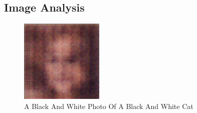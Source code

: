 \documentclass{article}%
\begin{document}
%
\subsection{Image Analysis}%
\label{subsec:ImageAnalysis}%


\begin{figure}[h!]%
\centering%
\includegraphics[width=150px]{500_fake_images/samples_5_101.png}%
\caption{A Black And White Photo Of A Black And White Cat}%
\end{figure}

%
\end{document}
